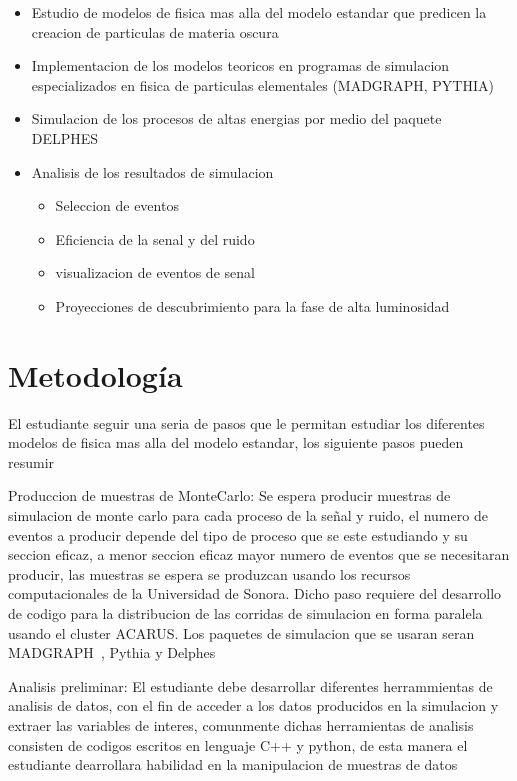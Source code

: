 \begin{itemize}
    \item Estudio de modelos de fisica mas alla del modelo estandar que predicen la creacion de particulas de materia oscura 
    \item Implementacion de los modelos teoricos en programas de simulacion especializados en fisica de particulas elementales (MADGRAPH, PYTHIA)
    \item Simulacion de los procesos de altas energias por medio del paquete DELPHES 
    \item Analisis de los resultados de simulacion
    \begin{itemize}
        \item Seleccion de eventos 
        \item Eficiencia de la senal y del ruido 
        \item visualizacion de eventos de senal 
        \item Proyecciones de descubrimiento para la fase de alta luminosidad 
    \end{itemize}
\end{itemize}

\chapter{Metodología}

El estudiante seguir una seria de pasos que le permitan estudiar los diferentes modelos de fisica mas alla del modelo estandar, los siguiente pasos pueden resumir 


Produccion de muestras de MonteCarlo: Se espera producir muestras de simulacion de monte carlo para cada proceso de la se\~nal y ruido, el numero de eventos a producir depende del tipo de proceso que se este estudiando y su seccion eficaz, a menor seccion eficaz mayor numero de eventos que se necesitaran producir, las muestras se espera se produzcan usando los recursos computacionales de la Universidad de Sonora. Dicho paso requiere del desarrollo de codigo para la distribucion de las corridas de simulacion en forma paralela usando el cluster ACARUS. Los paquetes de simulacion que se usaran seran MADGRAPH~\cite{Alwall:2007st}, Pythia y Delphes~\cite{deFavereau2014}

Analisis preliminar: El estudiante debe desarrollar diferentes herrammientas de analisis de datos, con el fin de acceder a los datos producidos en la simulacion y extraer las variables de interes, comunmente dichas herramientas de analisis consisten de codigos escritos en lenguaje C++ y python, de esta manera el estudiante dearrollara habilidad en la manipulacion de muestras de datos 

